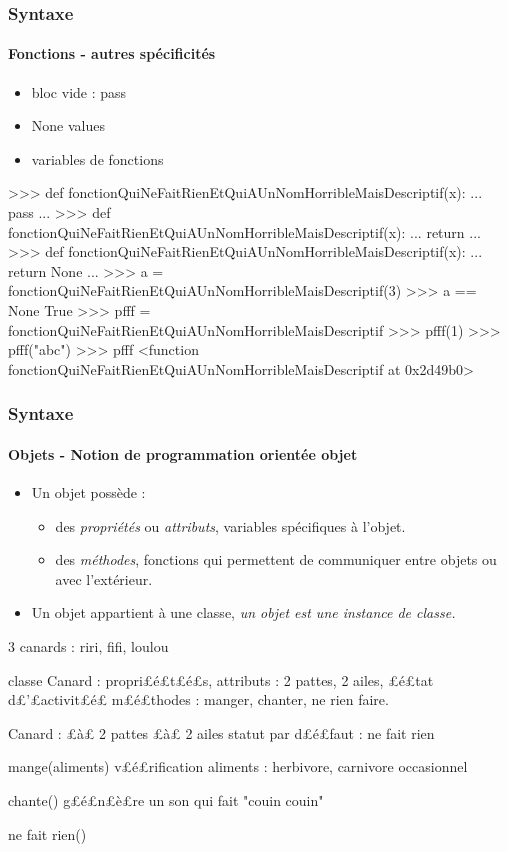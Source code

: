 \begin{frame}[fragile]
\frametitle{Syntaxe}
\framesubtitle{Fonctions - autres spécificités}
\begin{itemize}
\item bloc vide : pass 
\item None values
\item variables de fonctions 
\end{itemize}
\begin{pythonConsole}
>>> def fonctionQuiNeFaitRienEtQuiAUnNomHorribleMaisDescriptif(x): 
...    pass
...
>>> def fonctionQuiNeFaitRienEtQuiAUnNomHorribleMaisDescriptif(x): 
...    return
...
>>> def fonctionQuiNeFaitRienEtQuiAUnNomHorribleMaisDescriptif(x): 
...    return None
...
>>> a = fonctionQuiNeFaitRienEtQuiAUnNomHorribleMaisDescriptif(3)
>>> a == None
True
>>> pfff = fonctionQuiNeFaitRienEtQuiAUnNomHorribleMaisDescriptif
>>> pfff(1)
>>> pfff("abc")
>>> pfff
<function fonctionQuiNeFaitRienEtQuiAUnNomHorribleMaisDescriptif at 0x2d49b0>
\end{pythonConsole}
\end{frame}
\begin{frame}[fragile]
\frametitle{Syntaxe}
\framesubtitle{Objets - Notion de programmation orientée objet}
\begin{itemize}
\item Un objet possède : 
 \begin{itemize}
 \footnotesize
  \item des {\em propriétés} ou {\em attributs}, variables spécifiques à l'objet. 
  \item des {\em méthodes}, fonctions qui permettent de communiquer entre objets ou avec l'extérieur. 
 \end{itemize}
\item \small Un objet appartient à une classe, {\em un objet est une instance de classe. }
\end{itemize}

\begin{pythonConsole}
3 canards : riri, fifi, loulou

classe Canard : 
propri£é£t£é£s, attributs : 2 pattes, 2 ailes, £é£tat d£'£activit£é£
m£é£thodes : manger, chanter, ne rien faire.  

Canard : 
 £à£ 2 pattes
 £à£ 2 ailes
 statut par d£é£faut : ne fait rien
 
 mange(aliments)
  v£é£rification aliments : herbivore, carnivore occasionnel 
 
 chante()
  g£é£n£è£re un son qui fait "couin couin"  

 ne fait rien()
 
\end{pythonConsole}
\end{frame}
